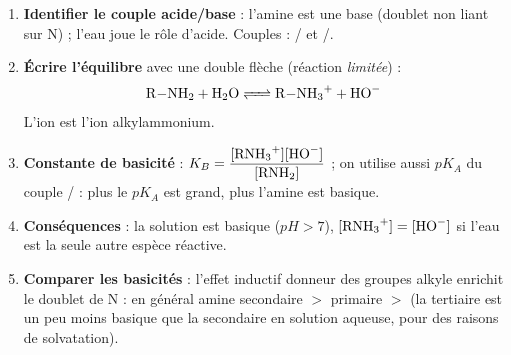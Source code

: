 \documentclass[11pt]{article}
\newcommand{\cle}[1]{{\popxbold\color{popdark}#1}}
\begin{document}
\begin{methode}
\begin{enumerate}
\item \textbf{Identifier le couple acide/base} : l'amine  est une base (doublet non liant sur N) ; l'eau joue le rôle d'acide. Couples : / et /.
\item \textbf{Écrire l'équilibre} avec une double flèche (réaction \emph{limitée}) :
\[ \ce{R-NH2 + H2O <=> R-NH3+ + HO-} \]
L'ion  est l'\cle{ion alkylammonium}.
\item \textbf{Constante de basicité} : $K_B = \dfrac{[\ce{RNH3+}][\ce{HO-}]}{[\ce{RNH2}]}$ ; on utilise aussi $pK_A$ du couple / : plus le $pK_A$ est grand, plus l'amine est basique.
\item \textbf{Conséquences} : la solution est basique ($pH > 7$), $[\ce{RNH3+}] = [\ce{HO-}]$ si l'eau est la seule autre espèce réactive.
\item \textbf{Comparer les basicités} : l'effet inductif donneur des groupes alkyle enrichit le doublet de N : en général amine secondaire $>$ primaire $>$  (la tertiaire est un peu moins basique que la secondaire en solution aqueuse, pour des raisons de solvatation).
\end{enumerate}
\end{methode}
\end{document}
